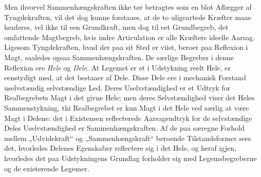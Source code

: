 \documentclass[12pt,a4paper]{book}
\begin{document}
Men ihvorvel Sammenhængskraften ikke tør betragtes som en blot Aflægger
af Tyngdekraften, vil det dog kunne forstaaes, at de to uligeartede
Kræfter maae henføres, vel ikke til een Grundkraft, men dog til eet
Grundbegreb, det omfattende Magtbegreb, hvis indre Articulation er alle
Kræfters ideelle Aarsag. Ligesom Tyngdekraften, hvad der paa sit Sted er
viist, beroer paa Reflexion i Magt, saaledes ogsaa Sammenhængskraften. De
særlige Begreber i denne Reflexion ere \emph{Hele} og \emph{Dele}. At
Legemet er et i Udstykning reelt Hele, er eenstydigt med, at det bestaaer
af Dele. Disse Dele ere i mechanisk Forstand uselvstændig selvstændige
Led. Deres Uselvstændighed er et Udtryk for Realbegrebets Magt i det
givne Hele; men deres Selvstændighed viser det Heles Sammenstykning, thi
Realbegrebet er kun Magt i det Hele ved særlig at være Magt i Delene: det
i Existensen reflecterede Aarsagsudtryk for de selvstændige Deles
Uselvstændighed er Sammenhængskraften. Af de paa særegne Forhold mellem
„Udvidekraft“ og „Sammenhængskraft“ beroende Tilstandsformer sees det,
hvorledes Delenes Egenskaber reflectere sig i det Hele, og heraf igjen,
hvorledes det paa Udstykningens Grundlag forholder sig med
Legemsbegreberne og de existerende Legemer.
\end{document}
